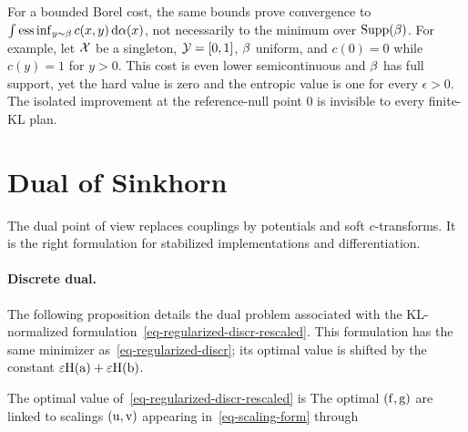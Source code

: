 \begin{rem}\label{rem-semi-relaxed-essential-infimum}
For a bounded Borel cost, the same bounds prove convergence to $\int\operatorname*{ess\,inf}_{y\sim\beta}c(x,y)\,\mathrm{d}\alpha(x)$, not necessarily to the minimum over $\operatorname{Supp}(\beta)$. For example, let $\mathcal{X}$ be a singleton, $\mathcal{Y}=[0,1]$, $\beta$ uniform, and $c(0)=0$ while $c(y)=1$ for $y>0$. This cost is even lower semicontinuous and $\beta$ has full support, yet the hard value is zero and the entropic value is one for every $\epsilon>0$. The isolated improvement at the reference-null point $0$ is invisible to every finite-KL plan.
\end{rem}


\section{Dual of Sinkhorn}\label{sec-dual-sinkhorn}

The dual point of view replaces couplings by potentials and soft $c$-transforms. It is the right formulation for stabilized implementations and differentiation.

\paragraph{Discrete dual.}

The following proposition details the dual problem associated with the KL-normalized formulation~\eqref{eq-regularized-discr-rescaled}. This formulation has the same minimizer as~\eqref{eq-regularized-discr}; its optimal value is shifted by the constant $\varepsilon\mathrm{H}(\mathrm{a})+\varepsilon\mathrm{H}(\mathrm{b})$.

\begin{prop}
The optimal value of~\eqref{eq-regularized-discr-rescaled} is
%
The optimal $(\mathrm{f},\mathrm{g})$ are linked to scalings $(\mathrm{u},\mathrm{v})$ appearing in~\eqref{eq-scaling-form} through
\end{prop}

